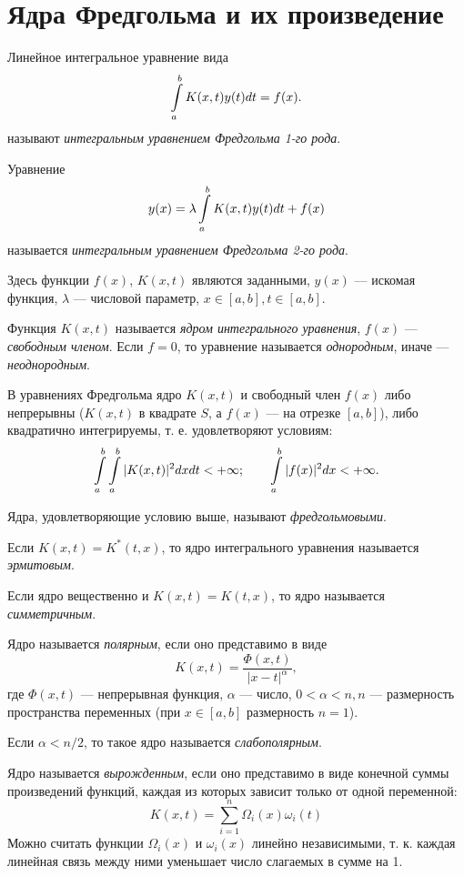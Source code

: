 \section{Ядра Фредгольма и их произведение}
\label{sec:q-30}
Линейное интегральное уравнение вида
$$\int\displaylimits_{a}^{b}K(x, t) y(t) dt = f(x).$$
называют \textit{интегральным уравнением Фредгольма 1-го рода}.

Уравнение
\begin{equation}
y(x) = \lambda \int\displaylimits_{a}^{b}K(x, t)y(t)dt + f(x) \label{eq:1}
\end{equation}
называется \textit{интегральным уравнением Фредгольма 2-го рода}.

Здесь функции $f(x)$, $K(x,t)$ являются заданными, $y(x)$ --- искомая функция, $\lambda$ --- числовой параметр, $x \in [a,b], t \in [a, b]$.

Функция $K(x, t)$ называется \textit{ядром интегрального уравнения}, $f(x)$ --- \textit{свободным членом}. Если $f = 0$, то уравнение называется \textit{однородным}, иначе --- \textit{неоднородным}.

В уравнениях Фредгольма ядро $K(x, t)$ и свободный член $f(x)$ либо непрерывны ($K(x, t)$ в квадрате $S$, а $f(x)$ --- на отрезке $[a, b]$), либо квадратично интегрируемы, т. е. удовлетворяют условиям:
$$\int\displaylimits_a^b\int\displaylimits_a^b|K(x, t)|^2dxdt < + \infty; \qquad \int\displaylimits_a^b|f(x)|^2 dx < + \infty.$$

Ядра, удовлетворяющие условию выше, называют \textit{фредгольмовыми}.

Если $K(x, t) = K^*(t, x)$, то ядро интегрального уравнения называется \textit{эрмитовым}.

Если ядро вещественно и $K(x, t) = K(t, x)$, то ядро называется \textit{симметричным}.

Ядро называется \textit{полярным}, если оно представимо в виде
$$K(x, t) = \frac{\Phi(x, t)}{|x - t|^\alpha},$$
где $\Phi(x, t)$ --- непрерывная функция, $\alpha$ --- число, $0 < \alpha < n, n$ --- размерность пространства переменных (при $x \in [a, b]$ размерность $n = 1$).

Если $\alpha < n / 2$, то такое ядро называется \textit{слабополярным}.

Ядро называется \textit{вырожденным}, если оно представимо в виде конечной суммы произведений функций, каждая из которых зависит только от одной переменной:
$$K(x, t) = \sum_{i = 1}^{n} \Omega_i(x)\omega_i(t)$$
Можно считать функции $\Omega_i(x)$ и $\omega_i(x)$ линейно независимыми, т. к. каждая линейная связь между ними уменьшает число слагаемых в сумме на 1.